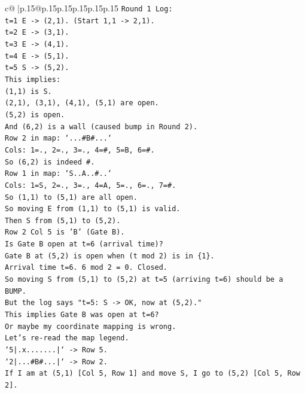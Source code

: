 \documentclass{article}
\begin{document}
{\begin{supertabular}{c@{$\;$}|p{.15\linewidth}@{}p{.15\linewidth}p{.15\linewidth}p{.15\linewidth}p{.15\linewidth}p{.15\linewidth}}
{{{\texttt{Round 1 Log:} \\
\texttt{t=1 E {-}> (2,1). (Start 1,1 {-}> 2,1).} \\
\texttt{t=2 E {-}> (3,1).} \\
\texttt{t=3 E {-}> (4,1).} \\
\texttt{t=4 E {-}> (5,1).} \\
\texttt{t=5 S {-}> (5,2).} \\
\texttt{This implies:} \\
\texttt{(1,1) is S.} \\
\texttt{(2,1), (3,1), (4,1), (5,1) are open.} \\
\texttt{(5,2) is open.} \\
\texttt{And (6,2) is a wall (caused bump in Round 2).} \\
\texttt{Row 2 in map: `...\#B\#...`} \\
\texttt{Cols: 1=., 2=., 3=., 4=\#, 5=B, 6=\#.} \\
\texttt{So (6,2) is indeed \#.} \\
\texttt{Row 1 in map: `S..A..\#..`} \\
\texttt{Cols: 1=S, 2=., 3=., 4=A, 5=., 6=., 7=\#.} \\
\texttt{So (1,1) to (5,1) are all open.} \\
\texttt{So moving E from (1,1) to (5,1) is valid.} \\
\texttt{Then S from (5,1) to (5,2).} \\
\texttt{Row 2 Col 5 is 'B' (Gate B).} \\
\texttt{Is Gate B open at t=6 (arrival time)?} \\
\texttt{Gate B at (5,2) is open when (t mod 2) is in \{1\}.} \\
\texttt{Arrival time t=6. 6 mod 2 = 0. Closed.} \\
\texttt{So moving S from (5,1) to (5,2) at t=5 (arriving t=6) should be a BUMP.} \\
\texttt{But the log says "t=5: S {-}> OK, now at (5,2)."} \\
\texttt{This implies Gate B was open at t=6?} \\
\texttt{Or maybe my coordinate mapping is wrong.} \\
\texttt{Let's re{-}read the map legend.} \\
\texttt{`5|.x.......|` {-}> Row 5.} \\
\texttt{`2|...\#B\#...|` {-}> Row 2.} \\
\texttt{If I am at (5,1) {[}Col 5, Row 1{]} and move S, I go to (5,2) {[}Col 5, Row 2{]}.} \\
}}}
\end{supertabular}}
\end{document}
